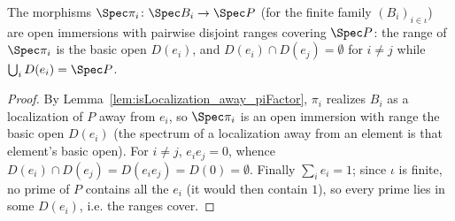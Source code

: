 \begin{lemma}
  \label{lem:opensRange_eval_clopen}
  \leanok
  The morphisms \(\Spec \pi_i \colon \Spec B_i \to \Spec P\) (for the finite family
  \((B_i)_{i \in \iota}\)) are open immersions with pairwise disjoint ranges covering \(\Spec P\):
  the range of \(\Spec \pi_i\) is the basic open \(D(e_i)\), and \(D(e_i) \cap D(e_j) = \emptyset\)
  for \(i \ne j\) while \(\bigcup_i D(e_i) = \Spec P\).
\end{lemma}
\begin{proof}
  \leanok
  By Lemma~\ref{lem:isLocalization_away_piFactor}, \(\pi_i\) realizes \(B_i\) as a localization of
  \(P\) away from \(e_i\), so \(\Spec \pi_i\) is an open immersion with range the basic open
  \(D(e_i)\) (the spectrum of a localization away from an element is that element's basic open). For
  \(i \ne j\), \(e_i e_j = 0\), whence \(D(e_i) \cap D(e_j) = D(e_i e_j) = D(0) = \emptyset\).
  Finally \(\sum_i e_i = 1\); since \(\iota\) is finite, no prime of \(P\) contains all the \(e_i\)
  (it would then contain \(1\)), so every prime lies in some \(D(e_i)\), i.e. the ranges cover.
\end{proof}

